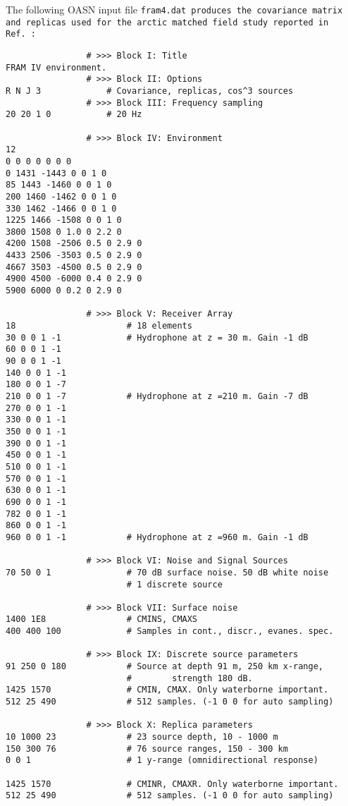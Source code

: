 The following OASN input file \tt fram4.dat \rm produces the covariance matrix and
replicas used for the arctic matched field study reported in
Ref.~\cite{sbk:jasa90}:

\small
\begin{verbatim}
                # >>> Block I: Title
FRAM IV environment.
                # >>> Block II: Options
R N J 3             # Covariance, replicas, cos^3 sources
                # >>> Block III: Frequency sampling
20 20 1 0           # 20 Hz

                # >>> Block IV: Environment
12				
0 0 0 0 0 0 0
0 1431 -1443 0 0 1 0
85 1443 -1460 0 0 1 0
200 1460 -1462 0 0 1 0
330 1462 -1466 0 0 1 0
1225 1466 -1508 0 0 1 0
3800 1508 0 1.0 0 2.2 0
4200 1508 -2506 0.5 0 2.9 0
4433 2506 -3503 0.5 0 2.9 0
4667 3503 -4500 0.5 0 2.9 0
4900 4500 -6000 0.4 0 2.9 0
5900 6000 0 0.2 0 2.9 0

                # >>> Block V: Receiver Array 
18                      # 18 elements
30 0 0 1 -1             # Hydrophone at z = 30 m. Gain -1 dB
60 0 0 1 -1
90 0 0 1 -1
140 0 0 1 -1
180 0 0 1 -7
210 0 0 1 -7            # Hydrophone at z =210 m. Gain -7 dB
270 0 0 1 -1
330 0 0 1 -1
350 0 0 1 -1
390 0 0 1 -1
450 0 0 1 -1
510 0 0 1 -1
570 0 0 1 -1
630 0 0 1 -1
690 0 0 1 -1
782 0 0 1 -1
860 0 0 1 -1
960 0 0 1 -1            # Hydrophone at z =960 m. Gain -1 dB

                # >>> Block VI: Noise and Signal Sources
70 50 0 1               # 70 dB surface noise. 50 dB white noise
                        # 1 discrete source

                # >>> Block VII: Surface noise
1400 1E8                # CMINS, CMAXS
400 400 100             # Samples in cont., discr., evanes. spec.

                # >>> Block IX: Discrete source parameters
91 250 0 180            # Source at depth 91 m, 250 km x-range,
                        #        strength 180 dB. 
1425 1570               # CMIN, CMAX. Only waterborne important.
512 25 490              # 512 samples. (-1 0 0 for auto sampling)

                # >>> Block X: Replica parameters
10 1000 23              # 23 source depth, 10 - 1000 m
150 300 76              # 76 source ranges, 150 - 300 km
0 0 1                   # 1 y-range (omnidirectional response)

1425 1570               # CMINR, CMAXR. Only waterborne important.
512 25 490              # 512 samples. (-1 0 0 for auto sampling)
\end{verbatim}
\normalsize

